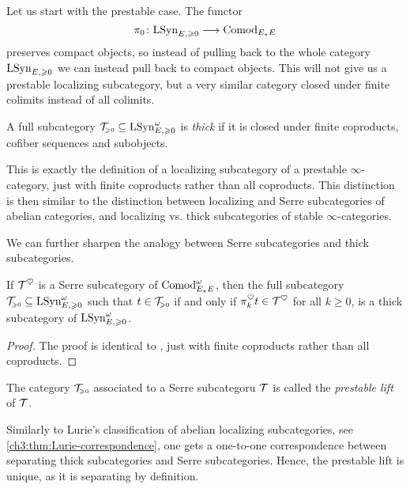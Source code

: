 Let us start with the prestable case. The functor 
\[\pi_0 \colon \mathrm{LSyn}_{E, \geqslant 0} \longrightarrow \mathrm{Comod}_{E_*E}\]
preserves compact objects, so instead of pulling back to the whole category $\mathrm{LSyn}_{E, \geqslant 0}$ we can instead pull back to compact objects. This will not give us a prestable localizing subcategory, but a very similar category closed under finite colimits instead of all colimits. 

\begin{definition}
    A full subcategory $\mathcal{T}_{\hspace{-1pt}\scriptscriptstyle\geqslant 0} \subseteq \mathrm{LSyn}_{E, \geqslant 0}^\omega$ is \emph{thick} if it is closed under finite coproducts, cofiber sequences and subobjects. 
\end{definition}

\begin{remark}
    This is exactly the definition of a localizing subcategory of a prestable $\infty$-category, just with finite coproducts rather than all coproducts. This distinction is then similar to the distinction between localizing and Serre subcategories of abelian categories, and localizing vs. thick subcategories of stable $\infty$-categories. 
\end{remark}

We can further sharpen the analogy between Serre subcategories and thick subcategories. 

\begin{lemma}
    If $\mathcal{T}^\heartsuit$ is a Serre subcategory of $\mathrm{Comod}_{E_*E}^\omega$, then the full subcategory $\mathcal{T}_{\hspace{-1pt}\scriptscriptstyle\geqslant 0}\subseteq \mathrm{LSyn}_{E, \geqslant 0}^\omega$ such that $t\in \mathcal{T}_{\hspace{-1pt}\scriptscriptstyle\geqslant 0}$ if and only if $\pi^\heartsuit_k t \in \mathcal{T}^\heartsuit$ for all $k\geq 0$, is a thick subcategory of $\mathrm{LSyn}_{E, \geqslant 0}^\omega$. 
\end{lemma}
\begin{proof}
    The proof is identical to \cite[C.5.2.7]{lurie_SAG}, just with finite coproducts rather than all coproducts. 
\end{proof}

\begin{definition}
    The category $\mathcal{T}_{\hspace{-1pt}\scriptscriptstyle\geqslant 0}$ associated to a Serre subcategoru $\mathcal{T}$ is called the \emph{prestable lift} of $\mathcal{T}$. 
\end{definition}

\begin{definition}
    Similarly to Lurie's classification of abelian localizing subcategories, see \cref{ch3:thm:Lurie-correspondence}, one gets a one-to-one correspondence between separating thick subcategories and Serre subcategories. Hence, the prestable lift is unique, as it is separating by definition. 
\end{definition}

